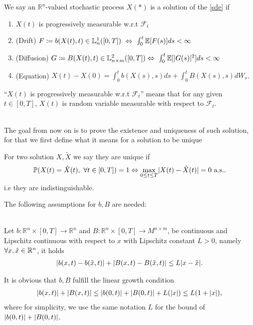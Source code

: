 \begin{definition}[Solution]\label{DefSol}
 We say an $\mathbb{R}^{n}$-valued stochastic process $X(*)$ is a solution of the \autoref{sde} if 
 \begin{enumerate}
  \item $X(t)$ is progressively measurable w.r.t $\mathcal{F}_t$
  \item (Drift) $F\coloneqq b(X(t),t) \in  \mathbb{L}_{n}^{1}([0,T]) \ \Leftrightarrow \  \int_0^{t} \mathbb{E}[F(s)] ds < \infty $ 
  \item (Diffusion) $G\coloneqq B(X(t),t) \in  \mathbb{L}_{n \times m}^{2}([0,T]) \Leftrightarrow \  \int_0^{t} \mathbb{E}[\lvert G(s)\rvert^2] ds < \infty $ 
  \item (Equation) $X(t) - X(0) = \int_0^{t}  b(X(s),s) ds + \int_0^{t} B(X(s),s) dW_s $.
 \end{enumerate}
\end{definition}
\begin{remark}
  ``$X(t)$ is progressively measurable w.r.t $\mathcal{F}_t$'' means that for any given $t \in  [0,T]$, $X(t)$ is random variable measurable with respect to $\mathcal{F}_t$.
\end{remark}
\hspace{0mm}\\
The goal from now on is to prove the existence and uniqueness of such solution, for that we first define what it means 
for a solution to be unique
\begin{definition}
 For two solution $X,\tilde{X} $ we say they are unique if
 \begin{align*}
   \mathbb{P}(X(t) = \tilde{X}(t), \ \forall  t \in  [0,T] ) = 1 \Leftrightarrow \max_{0\le t \le T} \lvert X(t)-\tilde{X}(t) \rvert  = 0 \text{ a.s.}
 .\end{align*}
 i.e they are indistinguishable.
\end{definition}
\vskip5mm
The following assumptions for $b,B$ are needed:
\begin{assumption}\label{assumption_sde_sol}\hspace{0mm}\\
  Let $b : \mathbb{R}^{n} \times  [0,T] \to  \mathbb{R}^{n}  $ and 
  $B : \mathbb{R}^{n} \times  [0,T] \to  M^{n \times m}  $,
  be continuous and Lipschitz continuous with respect to $x$ with Lipschitz constant $L > 0$, namely $\forall x,\tilde{x}\in \mathbb{R}^n$, it holds
  \begin{align*}
  \lvert b(x,t) - b(\tilde{x},t )\rvert +  \lvert B(x ,t) - B(\tilde{x},t )\rvert \le  L \lvert x - \tilde{x} \rvert
  .\end{align*}
\end{assumption} 
\begin{remark} 
	It is obvious that $b,B$ fulfill the linear growth condition
  \begin{align*}
    \lvert b(x,t)\rvert + \lvert B(x,t)\rvert \le  \lvert b(0,t)\rvert + \lvert B(0,t)\rvert+ L(\lvert x\rvert) \leq L(1+\lvert x\rvert),
  \end{align*}
  where for simplicity, we use the same notation $L$ for the bound of $\lvert b(0,t)\rvert + \lvert B(0,t)\rvert$.
\end{remark}

